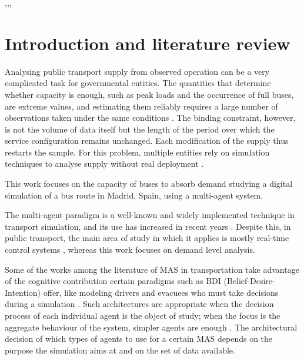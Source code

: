 \documentclass[a4paper,fleqn]{cas-sc}
\begin{document}

\begin{highlights}
\item 
\item 
\item 
\end{highlights}


\begin{keywords}
 \sep \sep \sep
\end{keywords}

\maketitle
\section{Introduction and literature review}\label{sec:intro}

Analysing public transport supply from observed operation can be a very complicated task for
governmental entities.
The quantities that determine whether capacity is
enough, such as peak loads and the occurrence of full buses, are extreme
values, and estimating them reliably requires a large number of observations
taken under the same conditions \cite{furth2006using}. The binding constraint,
however, is not the volume of data itself but the length of the period over
which the service configuration remains unchanged. Each modification of the supply
thus restarts the sample.
For this problem, multiple entities rely on simulation techniques to analyse
supply without real deployment \cite{toledo2010mesoscopic}.

This work focuses on the capacity of buses to absorb demand studying a digital simulation
of a bus route in Madrid, Spain, using a multi-agent system.


The multi-agent paradigm is a well-known and widely implemented technique in
transport simulation, and its use has increased in recent years
\cite{huang2022overview,divassonj2025abm,bastarianto2023agent}.
Despite this, in public transport, the main area of study in which it applies is
mostly real-time control systems \cite{balbo2024extended}, whereas this work focuses
on demand level analysis.

Some of the works among the literature of MAS in transportation take advantage of the
cognitive contribution certain paradigms
such as BDI (Belief-Desire-Intention) offer, like
modeling drivers and evacuees who must take decisions during a
simulation \cite{padgham2014integrating,singh2016integrating}.
Such architectures are appropriate when the decision process of each individual
agent is the object of study; when the focus is the aggregate behaviour of the
system, simpler agents are enough \cite{adam2016bdi}.
The architectural decision of which types of agents to use for a certain MAS depends on the
purpose the simulation aims at and on the set of
data available.
\end{document}
